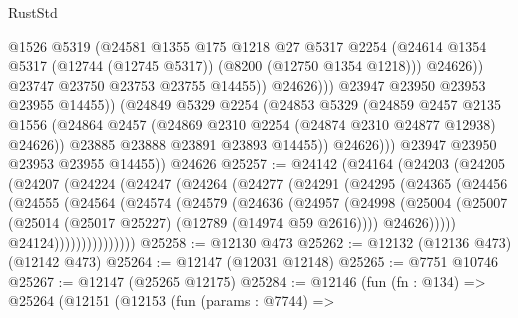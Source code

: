 \begin{lexlean}{RustStd}
\begin{coremodule}
                            @1526
                            @5319
                            (@24581
                              @1355
                              @175
                              @1218
                              @27
                              @5317
                              @2254
                              (@24614
                                @1354
                                @5317
                                (@12744 (@12745 @5317))
                                (@8200 (@12750 @1354 @1218)))
                              @24626))
                          @23747
                          @23750
                          @23753
                          @23755
                          @14455))
                      @24626)))
                @23947
                @23950
                @23953
                @23955
                @14455))
            (@24849
              @5329
              @2254
              (@24853
                @5329
                (@24859
                  @2457
                  @2135
                  @1556
                  (@24864 @2457 (@24869 @2310 @2254 (@24874 @2310 @24877 @12938) @24626))
                  @23885
                  @23888
                  @23891
                  @23893
                  @14455))
              @24626)))
        @23947
        @23950
        @23953
        @23955
        @14455))
    @24626
@25257 := @24142
    (@24164
      (@24203
        (@24205
          (@24207
            (@24224
              (@24247
                (@24264
                  (@24277
                    (@24291
                      (@24295
                        (@24365
                          (@24456
                            (@24555
                              (@24564
                                (@24574
                                  (@24579
                                    (@24636
                                      (@24957
                                        (@24998
                                          (@25004
                                            (@25007
                                              (@25014 (@25017 @25227) (@12789 (@14974 @59 @2616))))
                                            @24626)))))
                                  @24124)))))))))))))))
@25258 := @12130 @473
@25262 := @12132 (@12136 @473) (@12142 @473)
@25264 := @12147 (@12031 @12148)
@25265 := @7751 @10746
@25267 := @12147 (@25265 @12175)
@25284 := @12146
    (fun (fn : @134) =>
    @25264
      (@12151
        (@12153
          (fun (params : @7744) =>

\end{coremodule}
\end{lexlean}
